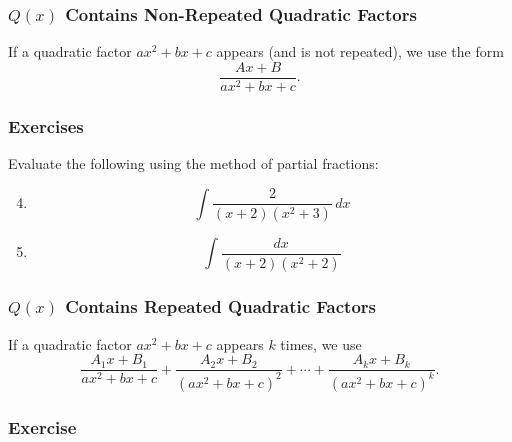 \subsubsection{$Q(x)$ Contains Non-Repeated Quadratic Factors}
\label{sss:qxco-886d}

If a quadratic factor $ax^2 + bx + c$ appears (and is not repeated), we use the form
\[
\frac{Ax + B}{ax^2 + bx + c}.
\]

\subsubsection{Exercises}
\label{sss:exer-pf2}

Evaluate the following using the method of partial fractions:

\begin{enumerate}
\setcounter{enumi}{3}

\item 
\[
\int \frac{2}{(x+2)(x^2+3)}\,dx
\]

\item 
\[
\int \frac{dx}{(x+2)(x^2+2)}
\]

\end{enumerate}

\subsubsection{$Q(x)$ Contains Repeated Quadratic Factors}
\label{sss:qxco-4e84}

If a quadratic factor $ax^2 + bx + c$ appears $k$ times, we use
\[
\frac{A_1x + B_1}{ax^2 + bx + c}
+ \frac{A_2x + B_2}{(ax^2 + bx + c)^2}
+ \cdots
+ \frac{A_kx + B_k}{(ax^2 + bx + c)^k}.
\]

\subsubsection{Exercise}
\label{sss:exer-pf3}

